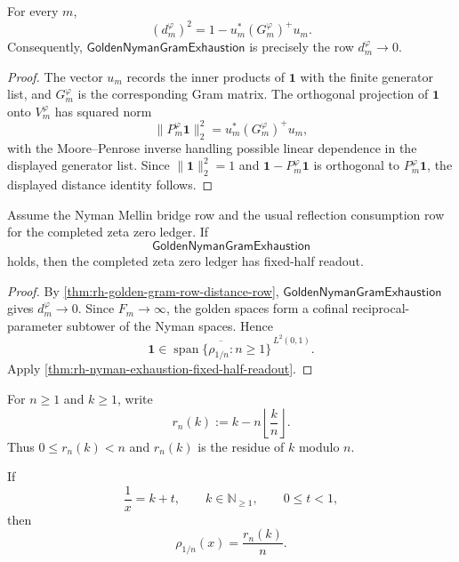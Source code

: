 \begin{theorem}
\label{thm:rh-golden-gram-row-distance-row}
For every $m$,
$$
(d_m^{\varphi})^2
=
1-u_m^\ast (G_m^{\varphi})^+u_m.
$$
Consequently, $\mathsf{GoldenNymanGramExhaustion}$ is precisely the row
$d_m^{\varphi}\to0$.
\end{theorem}

\begin{proof}
The vector $u_m$ records the inner products of $\mathbf 1$ with the
finite generator list, and $G_m^{\varphi}$ is the corresponding Gram
matrix.  The orthogonal projection of $\mathbf 1$ onto
$V_m^{\varphi}$ has squared norm
$$
\|P_m^{\varphi}\mathbf 1\|_2^2
=
u_m^\ast (G_m^{\varphi})^+u_m,
$$
with the Moore--Penrose inverse handling possible linear dependence in
the displayed generator list.  Since $\|\mathbf 1\|_2^2=1$ and
$\mathbf 1-P_m^{\varphi}\mathbf 1$ is orthogonal to
$P_m^{\varphi}\mathbf 1$, the displayed distance identity follows.
\end{proof}

\begin{corollary}
\label{cor:rh-golden-nyman-exhaustion-fixed-half-readout}
Assume the Nyman Mellin bridge row and the usual reflection consumption
row for the completed zeta zero ledger.  If
$$
\mathsf{GoldenNymanGramExhaustion}
$$
holds, then the completed zeta zero ledger has fixed-half readout.
\end{corollary}

\begin{proof}
By \autoref{thm:rh-golden-gram-row-distance-row},
$\mathsf{GoldenNymanGramExhaustion}$ gives $d_m^{\varphi}\to0$.  Since
$F_m\to\infty$, the golden spaces form a cofinal reciprocal-parameter
subtower of the Nyman spaces.  Hence
$$
\mathbf 1\in
\overline{
\operatorname{span}\{\rho_{1/n}:n\ge1\}
}^{\,L^2(0,1)}.
$$
Apply \autoref{thm:rh-nyman-exhaustion-fixed-half-readout}.
\end{proof}

\begin{definition}
\label{def:rh-nyman-residue-readback}
For $n\ge1$ and $k\ge1$, write
$$
r_n(k):=k-n\left\lfloor\frac{k}{n}\right\rfloor.
$$
Thus $0\le r_n(k)<n$ and $r_n(k)$ is the residue of $k$ modulo $n$.
\end{definition}

\begin{theorem}
\label{thm:rh-nyman-generators-residue-normal-form}
If
$$
\frac{1}{x}=k+t,
\qquad
k\in\mathbb N_{\ge1},
\qquad
0\le t<1,
$$
then
$$
\rho_{1/n}(x)=\frac{r_n(k)}{n}.
$$
\end{theorem}

